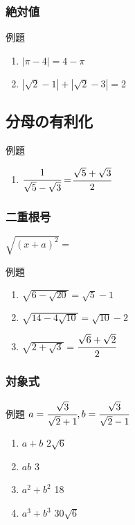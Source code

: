 \documentclass[10pt,dvipdfmx]{jsarticle}
\newcommand{\answer}[2]{{\color{orange}#2}}
\newcommand{\answer}[2]{\vspace{#1mm}}
\begin{document}
\subsubsection*{絶対値}
\begin{itembox}[l]{例題}
  \begin{large}
    \begin{enumerate}
      \item $|\pi-4|=$\answer{0}{$4-\pi$}
      \item $|\sqrt{2}-1|+|\sqrt{2}-3|=$\answer{0}{2}
    \end{enumerate}
  \end{large}
\end{itembox}
\subsection*{分母の有利化}
\begin{itembox}[l]{例題}
  \begin{large}
    \begin{enumerate}
      \item $\cfrac{1}{\sqrt{5}-\sqrt{3}}=$\answer{0}{$\cfrac{\sqrt{5}+\sqrt{3}}{2}$}
    \end{enumerate}
  \end{large}
\end{itembox}
\subsubsection*{二重根号}
\begin{Large}
  $\sqrt{(x+a)^2}=$
\end{Large}
\begin{itembox}[l]{例題}
  \begin{large}
    \begin{enumerate}
      \item $\sqrt{6-\sqrt{20}}=$\answer{0}{$\sqrt{5}-1$}
      \item $\sqrt{14-4\sqrt{10}}=$\answer{0}{$\sqrt{10}-2$}
      \item $\sqrt{2+\sqrt{3}}=$\answer{0}{$\cfrac{\sqrt{6}+\sqrt{2}}{2}$}
    \end{enumerate}
  \end{large}
\end{itembox}

\subsubsection*{対象式}
\begin{itembox}[l]{例題}
  $a=\cfrac{\sqrt{3}}{\sqrt{2}+1}, b=\cfrac{\sqrt{3}}{\sqrt{2}-1}$
  \begin{large}
    \begin{enumerate}
      \item $a+b$ \answer{0}{$2\sqrt{6}$}
      \item $ab$ \answer{0}{3}
      \item $a^2+b^2$ \answer{0}{18}
      \item $a^3+b^3$ \answer{0}{$30\sqrt{6}$}
    \end{enumerate}
  \end{large}
\end{itembox}
\end{document}
